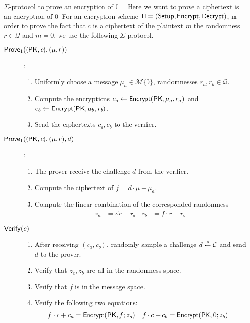 \begin{section}{$\Sigma$-protocol to prove an encryption of $0$~\cite{DBLP:conf/pkc/ChaidosG15}~\label{sigma0}}
  Here we want to prove a ciphertext is an encryption of $0$.
  For an encryption scheme $\Pi = ({\mathsf{Setup}}, {\mathsf{Encrypt}}, {\mathsf{Decrypt}})$,
  in order to prove the fact that $c$ is a ciphertext of the plaintext $m$ \wrt the randomness $r \in \mathcal{Q}$ and $m  = 0$,
  we use the following $\Sigma$-protocol.

  \begin{description}
    \item[${\mathsf{Prove}}_1((\mathsf{PK}, c), (\mu, r))$]:
    \begin{enumerate}
      \item Uniformly choose a message $\mu_a \in \mathcal{M} \{0\}$, randomnesses $r_a, r_b \in \mathcal{Q}$.
      \item Compute the encryptions $c_a \gets {\mathsf{Encrypt}}(\mathsf{PK}, \mu_a, r_a)$ and $c_b \gets {\mathsf{Encrypt}}(\mathsf{PK}, \mu_b, r_b)$.
      \item Send the ciphertexts $c_a, c_b$ to the verifier.
    \end{enumerate}
    \item[${\mathsf{Prove}}_1((\mathsf{PK}, c), (\mu, r), d)$]:
    \begin{enumerate}
      \item The prover receive the challenge $d$ from the verifier.
      \item Compute the ciphertext of $f = d \cdot \mu + \mu_a$.
      \item Compute the linear combination of the corresponded randomness
      \begin{align*}
        z_a &= d r + r_a  & z_b &= f \cdot r + r_b.
      \end{align*}
    \end{enumerate}
  \item[${\mathsf{Verify}}(c)$]
    \begin{enumerate}
    \item After receiving $(c_a, c_b)$, randomly sample a challenge $ d \stackrel{{\scriptscriptstyle \mkern4mu \$}}{\gets} \mathcal{C}$ and send $d$ to the prover.
    \item Verify that $z_a, z_b$ are all in the randomness space.
    \item Verify that $f$ is in the message space.
    \item Verify the following two equations:
      \begin{align*}
        f \cdot c + c_a &= {\mathsf{Encrypt}}(\mathsf{PK}, f; z_a) &  f \cdot c + c_b &= {\mathsf{Encrypt}}(\mathsf{PK}, 0; z_b)
      \end{align*}
    \end{enumerate}
  \end{description}



\end{section}



